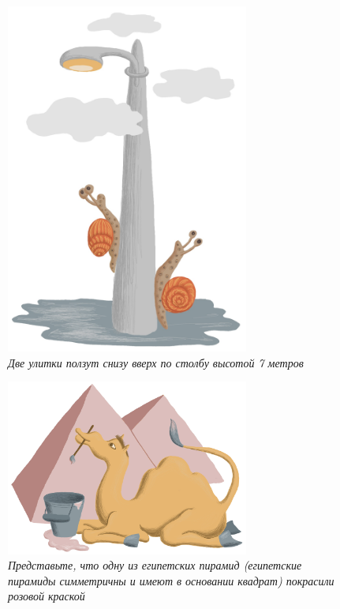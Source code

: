 \documentclass[10pt]{scrbook} \usepackage{modules/nonstahp_book}
\begin{document}
\begin{figure} \begin{center}
	\includegraphics[width=8cm]{figures/color/07c.jpg}
	\vspace{1cm}
	\caption{
             {\itshape  Две улитки ползут снизу вверх по столбу высотой 7 метров }\medskip\\
             }
\end{center} \end{figure}

\begin{figure} \begin{center}
	\includegraphics[width=8cm]{figures/color/19c.jpg}
	\vspace{0.5cm}
	\caption{
             {\itshape  Представьте, что одну из египетских пирамид 
             (египетские пирамиды симметричны и имеют в основании квадрат) 
             покрасили розовой краской }\medskip\\
             }
\end{center} \end{figure}
\end{document}

